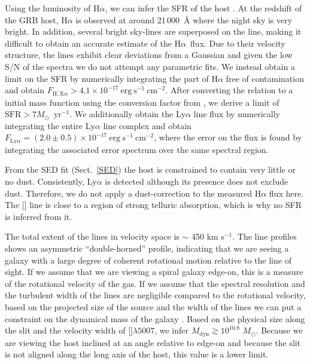 \documentclass[longauth]{aa}    %
\newcommand{\lya}{Ly$\alpha$}
\newcommand{\ha}{H$\alpha$}
\newcommand{\oii}{[\ion{O}{ii}]}
\newcommand{\oiii}{[\ion{O}{iii}]}
\begin{document}
Using the luminosity of \ha, we can infer the SFR of the host
\citep{Kennicutt1998}. At the redshift of the GRB host, \ha{} is observed at
around 21\,000~\AA{} where the night sky is very bright. In addition, several
bright sky-lines are superposed on the line, making it difficult to obtain  an accurate estimate of the
\ha~flux. Due to their velocity structure, the lines exhibit clear
deviations from a Gaussian and given the low S/N of the spectra we do not
attempt any parametric fits. We instead obtain a limit on the SFR by numerically
integrating the part of \ha{} free of contamination and obtain $F_{\mathrm{H,X} \alpha} >
4.1 \times 10^{-17}~\mathrm{erg}~\mathrm{s}^{-1}~\mathrm{cm}^{-2}$. After
converting the \citet{Kennicutt1998} relation to a \citet{Chabrier2003} initial
mass function using the conversion factor from \citet{Madau2014}, we derive a
limit of $\mathrm{SFR} > 7 M_\odot$~yr$^{-1}$. We additionally obtain the \lya{} line
flux by numerically integrating the entire \lya{} line complex and obtain
$F_{\mathrm{Ly}\alpha} = (2.0 \pm 0.5) \times 10^{-17}~\mathrm{erg}~
\mathrm{s}^{-1}~\mathrm{cm}^{-2}$, where the error on the flux is found by
integrating the associated error spectrum over the same spectral region.


From the SED fit (Sect.~\ref{SED}) the host is constrained to contain very
little or no dust. Consistently, \lya{} is detected although its presence does
not exclude dust. Therefore, we do not apply a dust-correction to the measured
\ha{} flux here. The  \oii{} line is close to a region of strong telluric absorption,
which is why no SFR is inferred from it.

The total extent of the lines in velocity space is $\sim$ 450 km s$^{-1}$. The line
profiles shows an asymmetric ``double-horned'' profile, indicating that we are
seeing a galaxy with a large degree of coherent rotational motion relative to
the line of sight. If we assume that we are viewing a spiral galaxy edge-on,
this is a measure of the rotational velocity of the gas. If we assume that the
spectral resolution and the turbulent width of the lines are negligible compared
to the rotational velocity, based on the projected size of the source
and the width of the lines we can put a constraint on the dynamical mass of the galaxy
\citep{DeBlok2014}. Based on the physical size along the slit and the velocity
width of \oiii$\lambda5007$, we infer $M_\text{dyn} \gtrsim 10^{10.8}$
$M_\odot$. Because we are viewing the host inclined at an angle relative to
edge-on and because the slit is not aligned along the long axis of the host,
this value is a lower limit. 
\end{document}
